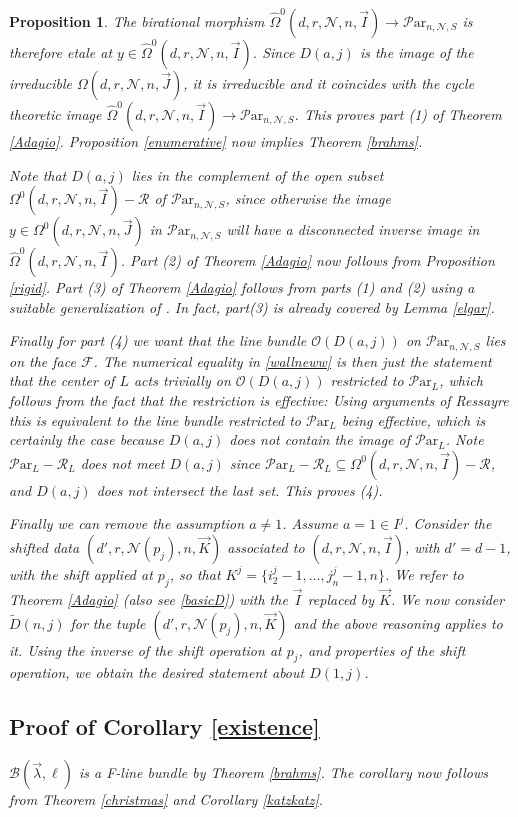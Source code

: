 \documentclass[11pt]{amsart}
\newcommand\mn{\mathcal{N}}
\newcommand\ParL{\mathcal{P}\text{ar}_L}
\newcommand\Par{\mathcal{P}\text{ar} }
\newtheorem{proposition}[theorem]{Proposition}
\numberwithin{theorem}{subsection}
\begin{document}
{\begin{proposition}
The birational morphism $\widehat{\Omega}^0(d,r,\mathcal{N},n,\vec{I})\to  {\Par}_{n,\mn,S}$ is therefore  etale at $y\in \widehat{\Omega}^0(d,r,\mathcal{N},n,\vec{I})$. Since $D(a,j)$ is the  image of the irreducible  $\Omega(d,r,\mathcal{N},n,\vec{J})$, it is irreducible and it coincides with the cycle theoretic image $\widehat{\Omega}^0(d,r,\mathcal{N},n,\vec{I})\to  {\Par}_{n,\mn,S}$. This proves part (1) of Theorem \ref{Adagio}. Proposition \ref{enumerative} now implies Theorem \ref{brahms}.

 Note that $D(a,j)$ lies in the complement of the open subset $\Omega^0(d,r,\mathcal{N},n,\vec{I})-\mathcal{R}$ of ${\Par}_{n,\mn,S}$, since otherwise the image $y\in \Omega^0(d,r,\mathcal{N},n,\vec{J})$ in ${\Par}_{n,\mn,S}$ will have a disconnected inverse image in $\widehat{\Omega}^0(d,r,\mathcal{N},n,\vec{I})$. Part (2) of Theorem \ref{Adagio} now follows from Proposition \ref{rigid}. Part (3) of Theorem \ref{Adagio} follows from parts (1) and (2) using a suitable generalization of \cite[Lemma 2.1]{BHermit}. In fact, part(3) is already covered by Lemma \ref{elgar}.

Finally for part (4) we want that the line bundle $\mathcal{O}(D(a,j))$ on ${\Par}_{n,\mn,S}$ lies on the face $\mathcal{F}$. The numerical equality in \eqref{wallneww} is then just the statement that the center of $L$ acts trivially on $\mathcal{O}(D(a,j))$ restricted to $\Par_L$, which follows from the fact that the restriction is effective: Using arguments of Ressayre \cite{R1} this is equivalent to the line bundle restricted to $\ParL$ being effective, which is certainly the case because $D(a,j)$ does not contain the image of $\ParL$. Note  $\ParL-\mathcal{R}_L$ does not meet $D(a,j)$ since $\ParL-\mathcal{R}_L\subseteq \Omega^0(d,r,\mathcal{N},n,\vec{I})-\mathcal{R}$, and $D(a,j)$ does not intersect the last set.  This proves (4).

Finally we can remove the assumption $a\neq 1$. Assume $a=1\in I^j$. Consider the shifted data
$(d',r,\mathcal{N}(p_j),n,\vec{K})$ associated to $(d,r,\mn,n,\vec{I})$, with $d'=d-1$, with the shift applied at $p_j$, so that $K^j=\{i^j_2-1,\dots, j^j_n -1,n\}$. We refer to Theorem \ref{Adagio} (also see \eqref{basicD}) with the $\vec{I}$ replaced by $\vec{K}$. We now consider $\tilde{D}(n,j)$ for the tuple $(d',r,\mathcal{N}(p_j),n,\vec{K})$ and the above reasoning applies to it.  Using the inverse of the shift operation at $p_j$, and properties of the shift operation, we obtain the desired statement about $D(1,j)$.\subsection{Proof of Corollary \ref{existence}}
$\mathcal{B}(\vec{\lambda},\ell)$ is a F-line bundle by Theorem \ref{brahms}. The corollary now follows from Theorem \ref{christmas} and Corollary \ref{katzkatz}.
\iffalse


\end{proposition}}
\end{document}
